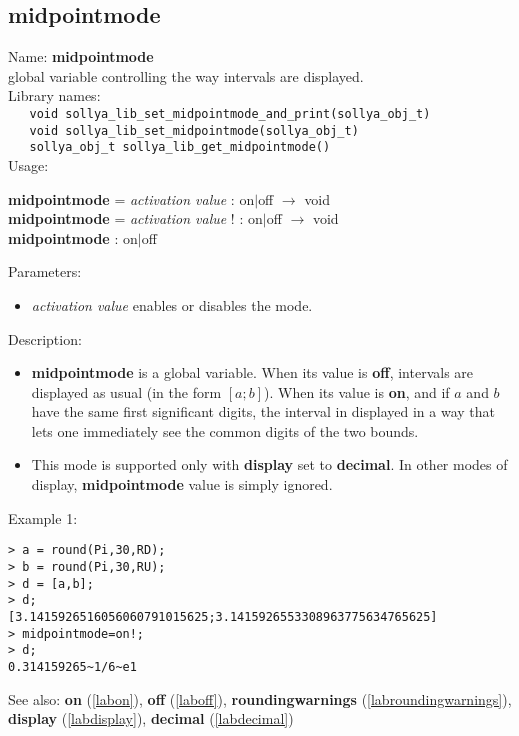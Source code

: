 \subsection{midpointmode}
\label{labmidpointmode}
\noindent Name: \textbf{midpointmode}\\
\phantom{aaa}global variable controlling the way intervals are displayed.\\[0.2cm]
\noindent Library names:\\
\verb|   void sollya_lib_set_midpointmode_and_print(sollya_obj_t)|\\
\verb|   void sollya_lib_set_midpointmode(sollya_obj_t)|\\
\verb|   sollya_obj_t sollya_lib_get_midpointmode()|\\[0.2cm]
\noindent Usage: 
\begin{center}
\textbf{midpointmode} = \emph{activation value} : \textsf{on$|$off} $\rightarrow$ \textsf{void}\\
\textbf{midpointmode} = \emph{activation value} ! : \textsf{on$|$off} $\rightarrow$ \textsf{void}\\
\textbf{midpointmode} : \textsf{on$|$off}\\
\end{center}
Parameters: 
\begin{itemize}
\item \emph{activation value} enables or disables the mode.
\end{itemize}
\noindent Description: \begin{itemize}

\item \textbf{midpointmode} is a global variable. When its value is \textbf{off}, intervals are displayed
   as usual (in the form $\left[ a;b\right]$).
   When its value is \textbf{on}, and if $a$ and $b$ have the same first significant digits,
   the interval in displayed in a way that lets one immediately see the common
   digits of the two bounds.

\item This mode is supported only with \textbf{display} set to \textbf{decimal}. In other modes of 
   display, \textbf{midpointmode} value is simply ignored.
\end{itemize}
\noindent Example 1: 
\begin{center}\begin{minipage}{15cm}\begin{Verbatim}[frame=single,commandchars=\\\|\~]
> a = round(Pi,30,RD);
> b = round(Pi,30,RU);
> d = [a,b];
> d;
[3.1415926516056060791015625;3.1415926553308963775634765625]
> midpointmode=on!;
> d;
0.314159265~1/6~e1
\end{Verbatim}
\end{minipage}\end{center}
See also: \textbf{on} (\ref{labon}), \textbf{off} (\ref{laboff}), \textbf{roundingwarnings} (\ref{labroundingwarnings}), \textbf{display} (\ref{labdisplay}), \textbf{decimal} (\ref{labdecimal})
